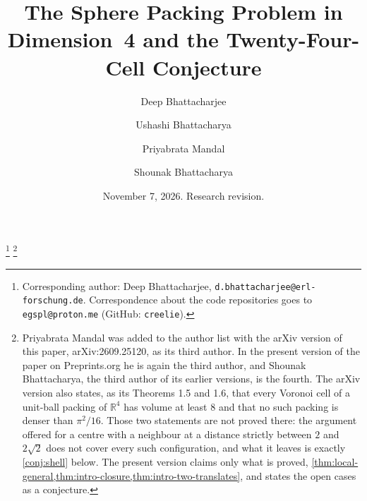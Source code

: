\documentclass[11pt,reqno]{amsart}
\renewcommand{\_}{\origunderscore\allowbreak}
\numberwithin{equation}{section}
\theoremstyle{plain}
\theoremstyle{definition}
\theoremstyle{remark}
\begin{document}
\title[Sphere packing in dimension four]{The Sphere Packing Problem in
Dimension~4 and the Twenty-Four-Cell Conjecture}

\author[D. Bhattacharjee]{Deep Bhattacharjee}
\address{Formerly, Electro-Gravitational Space Propulsion Laboratory (EGSPL),
Bhubaneswar, Odisha 751030, India; formerly, University of Calcutta (Heramba
Chandra College), 23/49 Gariahat Road, Golpark, Kolkata 700029, West Bengal,
India}
\thanks{Corresponding author: Deep Bhattacharjee,
\texttt{d.bhattacharjee@erl-forschung.de}. Correspondence about the code
repositories goes to \texttt{egspl@proton.me} (GitHub: \texttt{creelie}).}
\thanks{Priyabrata Mandal was added to the author list with the arXiv version
of this paper, arXiv:2609.25120, as its third author. In the present version
of the paper on Preprints.org he is again the third author, and Shounak
Bhattacharya, the third author of its earlier versions, is the fourth.
The arXiv version also states, as its Theorems 1.5 and 1.6, that every
Voronoi cell of a unit-ball packing of $\mathbb{R}^4$ has volume at least
$8$ and that no such packing is denser than $\pi^2/16$. Those two statements
are not proved there: the argument offered for a centre with a neighbour at
a distance strictly between $2$ and $2\sqrt2$ does not cover every such
configuration, and what it leaves is exactly \cref{conj:shell} below. The
present version claims only what is proved,
\cref{thm:local-general,thm:intro-closure,thm:intro-two-translates}, and
states the open cases as a conjecture.}

\author[U. Bhattacharya]{Ushashi Bhattacharya}
\address{Formerly, National Taiwan University, Taipei 106319, Taiwan}

\author[P. Mandal]{Priyabrata Mandal}
\address{Department of Mathematics, Bioinformatics and Computer Applications,
Maulana Azad National Institute of Technology Bhopal, Bhopal 462003, India}

\author[S. Bhattacharya]{Shounak Bhattacharya}
\address{Research Head, Asian College of Teachers, Kolkata, West Bengal, India}

\date{November 7, 2026. Research revision.}


\end{document}
